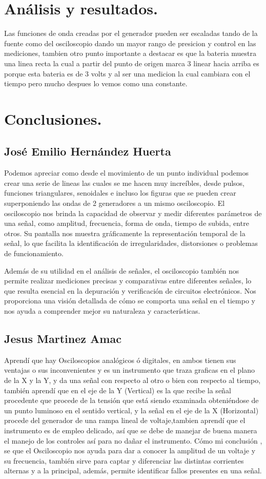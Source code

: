 \documentclass[10pt]{article}
\begin{document}
\begin{multicols}{2}
\section{Análisis y resultados.}
Las funciones de onda creadas por el generador pueden ser escaladas tando de la fuente como del osciloscopio dando un mayor rango de presicion y control en las mediciones, tambien otro punto importante a destacar es que la bateria muestra una linea recta la cual a partir del punto de origen marca 3 linear hacia arriba es porque esta bateria es de 3 volts y al ser una medicion la cual cambiara con el tiempo pero mucho despues lo vemos como una constante.

\section{Conclusiones.}
\subsection{José Emilio Hernández Huerta}
Podemos apreciar como desde el movimiento de un punto individual podemos crear una serie de lineas las cuales se me hacen muy increíbles, desde pulsos, funciones triangulares, senoidales e incluso los figuras que se pueden crear superponiendo las ondas de 2 generadores a un mismo osciloscopio. El osciloscopio nos brinda la capacidad de observar y medir diferentes parámetros de una señal, como amplitud, frecuencia, forma de onda, tiempo de subida, entre otros. Su pantalla nos muestra gráficamente la representación temporal de la señal, lo que facilita la identificación de irregularidades, distorsiones o problemas de funcionamiento.

Además de su utilidad en el análisis de señales, el osciloscopio también nos permite realizar mediciones precisas y comparativas entre diferentes señales, lo que resulta esencial en la depuración y verificación de circuitos electrónicos. Nos proporciona una visión detallada de cómo se comporta una señal en el tiempo y nos ayuda a comprender mejor su naturaleza y características.

\subsection{Jesus Martinez Amac}
Aprendí que hay Osciloscopios analógicos ó digitales, en ambos tienen sus ventajas o sus inconvenientes y es un instrumento que traza graficas en el plano de la X y la Y, y da una señal con respecto al otro o bien con respecto al tiempo, también aprendí que en el eje de la Y (Vertical) es la que recibe la señal procedente que procede de la tensión que está siendo examinada obteniéndose de un punto luminoso en el sentido vertical, y la señal en el eje de la X (Horizontal) procede del generador de una rampa lineal de voltaje,tambien aprendí que el instrumento es de empleo delicado, así que se debe de manejar de buena manera el manejo de los controles así para no dañar el instrumento.
Cómo mi conclusión , se que el Osciloscopio nos ayuda  para dar a  conocer la amplitud de un voltaje y su frecuencia, también sirve para captar y diferenciar las distintas corrientes alternas y a la principal, además, permite identificar fallos presentes en una señal.

\end{multicols}
\end{document}
